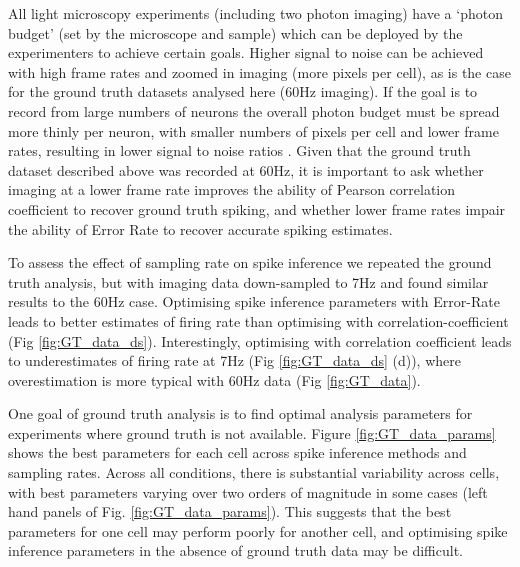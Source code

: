 \documentclass[a4paper,10pt,twocolumn]{article}
\begin{document}

All light microscopy experiments (including two photon imaging) have a `photon budget' (set by the microscope and sample) which can be deployed by the experimenters to achieve certain goals. Higher signal to noise can be achieved with high frame rates and zoomed in imaging (more pixels per cell), as is the case for the ground truth datasets analysed here (60Hz imaging). If the goal is to record from large numbers of neurons the overall photon budget must be spread more thinly per neuron, with smaller numbers of pixels per cell and lower frame rates, resulting in lower signal to noise ratios \citep{Peron2015-qz}. %
Given that the ground truth dataset described above was recorded at 60Hz, it is important to ask whether imaging at a lower frame rate improves the ability of Pearson correlation coefficient to recover ground truth spiking, and whether lower frame rates impair the ability of Error Rate to recover accurate spiking estimates.

To assess the effect of sampling rate on spike inference we repeated the ground truth analysis, but with imaging data down-sampled to 7Hz and found similar results to the 60Hz case. Optimising spike inference parameters with Error-Rate leads to better estimates of firing rate than optimising with correlation-coefficient (Fig \ref{fig:GT_data_ds}). Interestingly, optimising with correlation coefficient leads to underestimates of firing rate at 7Hz (Fig \ref{fig:GT_data_ds} (d)), where overestimation is more typical with 60Hz data (Fig \ref{fig:GT_data}).


One goal of ground truth analysis is to find optimal analysis parameters for experiments where ground truth is not available. Figure \ref{fig:GT_data_params} shows the best parameters for each cell across spike inference methods and sampling rates. Across all conditions, there is substantial variability across cells, with best parameters varying over two orders of magnitude in some cases (left hand panels of Fig. \ref{fig:GT_data_params}). This suggests that the best parameters for one cell may perform poorly for another cell, and optimising spike inference parameters in the absence of ground truth data may be difficult.
\end{document}
